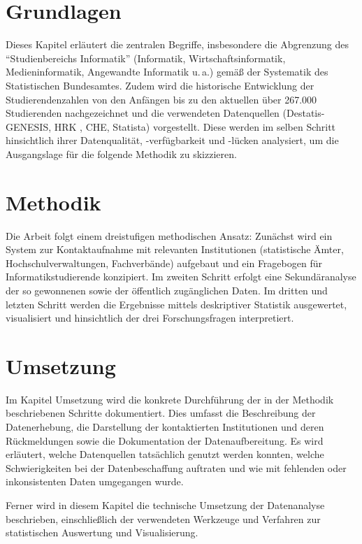 \section{Grundlagen}

Dieses Kapitel erläutert die zentralen Begriffe, insbesondere die Abgrenzung des ``Studienbereichs Informatik'' (Informatik, Wirtschaftsinformatik, Medieninformatik, Angewandte Informatik u.\,a.) gemäß der Systematik des Statistischen Bundesamtes. Zudem wird die historische Entwicklung der Studierendenzahlen von den Anfängen bis zu den aktuellen über 267.000 Studierenden \cite{destatisStudierende2025} nachgezeichnet und die verwendeten Datenquellen (Destatis-GENESIS, HRK \cite{hrkStatistik2025}, CHE, Statista) vorgestellt. Diese werden im selben Schritt hinsichtlich ihrer Datenqualität, -verfügbarkeit und -lücken analysiert, um die Ausgangslage für die folgende Methodik zu skizzieren.

\section{Methodik}

Die Arbeit folgt einem dreistufigen methodischen Ansatz: Zunächst wird ein System zur Kontaktaufnahme mit relevanten Institutionen (statistische Ämter, Hochschulverwaltungen, Fachverbände) aufgebaut und ein Fragebogen für Informatikstudierende konzipiert. Im zweiten Schritt erfolgt eine Sekundäranalyse der so gewonnenen sowie der öffentlich zugänglichen Daten. Im dritten und letzten Schritt werden die Ergebnisse mittels deskriptiver Statistik ausgewertet, visualisiert und hinsichtlich der drei Forschungsfragen interpretiert.

\section{Umsetzung}

Im Kapitel Umsetzung wird die konkrete Durchführung der in der Methodik beschriebenen Schritte dokumentiert. Dies umfasst die Beschreibung der Datenerhebung, die Darstellung der kontaktierten Institutionen und deren Rückmeldungen sowie die Dokumentation der Datenaufbereitung. Es wird erläutert, welche Datenquellen tatsächlich genutzt werden konnten, welche Schwierigkeiten bei der Datenbeschaffung auftraten und wie mit fehlenden oder inkonsistenten Daten umgegangen wurde.

Ferner wird in diesem Kapitel die technische Umsetzung der Datenanalyse beschrieben, einschließlich der verwendeten Werkzeuge und Verfahren zur statistischen Auswertung und Visualisierung.

